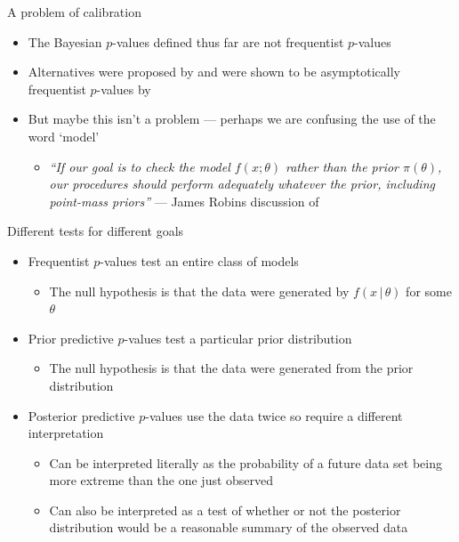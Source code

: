 \begin{frame}{A problem of calibration}
  \begin{itemize}
    \item The Bayesian $p$-values defined thus far are not frequentist $p$-values
    \vspace{\baselineskip}
    \pause
    \item Alternatives were proposed by \cite{Bayarri1999-ty} and were shown to be asymptotically frequentist $p$-values by \cite{Robins2000-oz}
    \vspace{\baselineskip}
    \pause
    \item But maybe this isn't a problem --- perhaps we are confusing the use of the word `model'
    \begin{itemize}
      \item \textit{``If our goal is to check the model $f(x;\theta)$ rather than the prior $\pi(\theta)$, our procedures should perform adequately whatever the prior, including point-mass priors''} --- James Robins discussion of \cite{Bayarri1999-ty}
    \end{itemize}
  \end{itemize}
\end{frame}

\begin{frame}{Different tests for different goals}
  \begin{itemize}
    \item Frequentist $p$-values test an entire class of models
    \begin{itemize}
      \item The null hypothesis is that the data were generated by $f(x\,|\,\theta)$ for some $\theta$
    \end{itemize}
    \vspace{\baselineskip}
    \pause
    \item Prior predictive $p$-values test a particular prior distribution
    \begin{itemize}
      \item The null hypothesis is that the data were generated from the prior distribution
    \end{itemize}
    \vspace{\baselineskip}
    \pause
    \item Posterior predictive $p$-values use the data twice so require a different interpretation
    \begin{itemize}
      \item Can be interpreted literally as the probability of a future data set being more extreme than the one just observed
      \item Can also be interpreted as a test of whether or not the posterior distribution would be a reasonable summary of the observed data
    \end{itemize}
  \end{itemize}
\end{frame}

